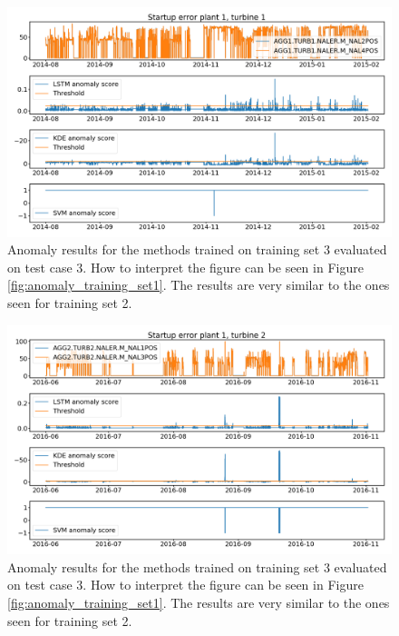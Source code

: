     \begin{figure}
        \centering
        \includegraphics[width=\textwidth]{report/figures/analysis/startup_errors/t1_n2_n4_startup_error_anomaly_score_3_long.png}
        \caption{Anomaly results for the methods trained on training set 3 evaluated on test case 3. How to interpret the figure can be seen in Figure \ref{fig:anomaly_training_set1}. The results are very similar to the ones seen for training set 2.}
    \end{figure}
    \begin{figure}
        \centering
        \includegraphics[width=\textwidth]{report/figures/analysis/startup_errors/t2_n1_n3_startup_error_anomaly_score_3_long.png}
        \caption{Anomaly results for the methods trained on training set 3 evaluated on test case 3. How to interpret the figure can be seen in Figure \ref{fig:anomaly_training_set1}. The results are very similar to the ones seen for training set 2.}
    \end{figure}